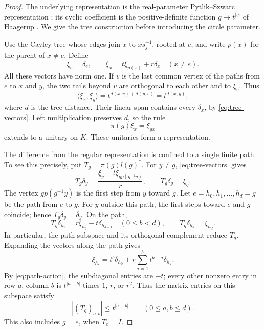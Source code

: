 \begin{proof}
The underlying representation is the real-parameter Pytlik--Szwarc
representation \cite[Section~2.3, Equation~(5)]{PS1986}; its cyclic
coefficient is the positive-definite function $g\mapsto t^{|g|}$
of Haagerup \cite[Lemma~1.2]{Haa1979}. We give the tree construction
before introducing the circle parameter.

Use the Cayley tree whose edges join $x$ to $xs_j^{\pm1}$, rooted at
$e$, and write $p(x)$ for the parent of $x\ne e$. Define
\begin{equation}\label{eq:tree-vectors}
 \xi_e=\delta_e,\qquad
 \xi_x=t\xi_{p(x)}+r\delta_x\quad(x\ne e).
\end{equation}
All these vectors have norm one. If $v$ is the last common vertex of the
paths from $e$ to $x$ and $y$, the two tails beyond $v$ are orthogonal
to each other and to $\xi_v$. Thus
\[
 \langle\xi_x,\xi_y\rangle
 =t^{d(x,v)+d(y,v)}=t^{d(x,y)},
\]
where $d$ is the tree distance. Their linear span contains every
$\delta_x$, by \eqref{eq:tree-vectors}. Left multiplication preserves
$d$, so the rule
\[
 \pi(g)\xi_x=\xi_{gx}
\]
extends to a unitary on $K$. These unitaries form a representation.

The difference from the regular representation is confined to a single
finite path. To see this precisely, put $T_g=\pi(g)l(g)^*$.
For $y\ne g$, \eqref{eq:tree-vectors} gives
\begin{equation}\label{eq:root-change}
 T_g\delta_y=
 \frac{\xi_y-t\xi_{g p(g^{-1}y)}}{r},
 \qquad T_g\delta_g=\xi_g.
\end{equation}
The vertex $g p(g^{-1}y)$ is the first step from $y$ toward $g$.
Let $e=h_0,h_1,\ldots,h_d=g$ be the path from $e$ to $g$.
For $y$ outside this path, the first steps toward $e$ and $g$
coincide; hence $T_g\delta_y=\delta_y$. On the path,
\begin{equation}\label{eq:path-action}
 T_g\delta_{h_b}=r\xi_{h_b}-t\delta_{h_{b+1}}\quad(0\leq b<d),
 \qquad T_g\delta_{h_d}=\xi_{h_d}.
\end{equation}
In particular, the path subspace and its orthogonal complement reduce
$T_g$. Expanding the vectors along the path gives
\[
 \xi_{h_b}=t^b\delta_{h_0}
       +r\sum_{a=1}^b t^{b-a}\delta_{h_a}.
\]
By \eqref{eq:path-action}, the subdiagonal entries are $-t$; every
other nonzero entry in row $a$, column $b$ is $t^{|a-b|}$ times
$1$, $r$, or $r^2$. Thus the matrix entries on this subspace satisfy
\begin{equation}\label{eq:path-decay}
 |(T_g)_{a,b}|\leq t^{|a-b|}\qquad(0\leq a,b\leq d).
\end{equation}
This also includes $g=e$, when $T_e=I$.


\end{proof}
